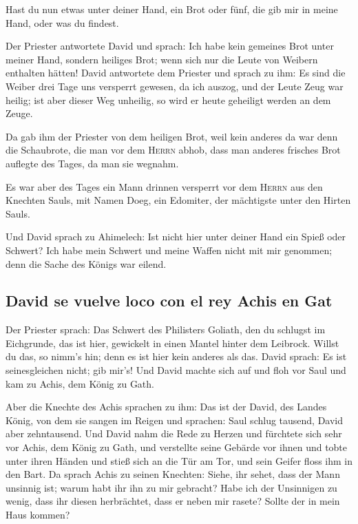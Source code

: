  Hast du nun etwas unter deiner Hand, ein Brot oder fünf,
die gib mir in meine Hand, oder was du findest.

 Der Priester antwortete David und sprach: Ich habe kein
gemeines Brot unter meiner Hand, sondern heiliges Brot; wenn sich nur
die Leute von Weibern enthalten hätten!  David antwortete
dem Priester und sprach zu ihm: Es sind die Weiber drei Tage uns
versperrt gewesen, da ich auszog, und der Leute Zeug war heilig; ist
aber dieser Weg unheilig, so wird er heute geheiligt werden an dem
Zeuge.

 Da gab ihm der Priester von dem heiligen Brot, weil kein
anderes da war denn die Schaubrote, die man vor dem \textsc{Herrn}
abhob, dass man anderes frisches Brot auflegte des Tages, da man sie
wegnahm.

 Es war aber des Tages ein Mann drinnen versperrt vor dem
\textsc{Herrn} aus den Knechten Sauls, mit Namen Doeg, ein Edomiter, der
mächtigste unter den Hirten Sauls.

 Und David sprach zu Ahimelech: Ist nicht hier unter
deiner Hand ein Spieß oder Schwert? Ich habe mein Schwert und meine
Waffen nicht mit mir genommen; denn die Sache des Königs war eilend.

\hypertarget{david-se-vuelve-loco-con-el-rey-achis-en-gat}{%
\subsection{David se vuelve loco con el rey Achis en
Gat}\label{david-se-vuelve-loco-con-el-rey-achis-en-gat}}

 Der Priester sprach: Das Schwert des Philisters Goliath,
den du schlugst im Eichgrunde, das ist hier, gewickelt in einen Mantel
hinter dem Leibrock. Willst du das, so nimm's hin; denn es ist hier kein
anderes als das. David sprach: Es ist seinesgleichen nicht; gib mir's!
 Und David machte sich auf und floh vor Saul und kam zu
Achis, dem König zu Gath.

 Aber die Knechte des Achis sprachen zu ihm: Das ist der
David, des Landes König, von dem sie sangen im Reigen und sprachen: Saul
schlug tausend, David aber zehntausend.  Und David nahm
die Rede zu Herzen und fürchtete sich sehr vor Achis, dem König zu Gath,
 und verstellte seine Gebärde vor ihnen und tobte unter
ihren Händen und stieß sich an die Tür am Tor, und sein Geifer floss ihm
in den Bart.  Da sprach Achis zu seinen Knechten: Siehe,
ihr sehet, dass der Mann unsinnig ist; warum habt ihr ihn zu mir
gebracht?  Habe ich der Unsinnigen zu wenig, dass ihr
diesen herbrächtet, dass er neben mir rasete? Sollte der in mein Haus
kommen?

